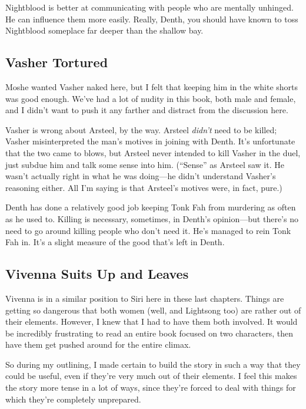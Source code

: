 Nightblood is better at communicating with people who are mentally unhinged. He can influence them more easily. Really, Denth, you should have known to toss Nightblood someplace far deeper than the shallow bay.

\subsection*{Vasher Tortured}

Moshe wanted Vasher naked here, but I felt that keeping him in the white shorts was good enough. We’ve had a lot of nudity in this book, both male and female, and I didn’t want to push it any farther and distract from the discussion here.

Vasher is wrong about Arsteel, by the way. Arsteel \textit{didn’t} need to be killed; Vasher misinterpreted the man’s motives in joining with Denth. It’s unfortunate that the two came to blows, but Arsteel never intended to kill Vasher in the duel, just subdue him and talk some sense into him. (“Sense” as Arsteel saw it. He wasn’t actually right in what he was doing—he didn’t understand Vasher’s reasoning either. All I’m saying is that Arsteel’s motives were, in fact, pure.)

Denth has done a relatively good job keeping Tonk Fah from murdering as often as he used to. Killing is necessary, sometimes, in Denth’s opinion—but there’s no need to go around killing people who don’t need it. He’s managed to rein Tonk Fah in. It’s a slight measure of the good that’s left in Denth.

\subsection*{Vivenna Suits Up and Leaves}

Vivenna is in a similar position to Siri here in these last chapters. Things are getting so dangerous that both women (well, and Lightsong too) are rather out of their elements. However, I knew that I had to have them both involved. It would be incredibly frustrating to read an entire book focused on two characters, then have them get pushed around for the entire climax.

So during my outlining, I made certain to build the story in such a way that they could be useful, even if they’re very much out of their elements. I feel this makes the story more tense in a lot of ways, since they’re forced to deal with things for which they’re completely unprepared.

